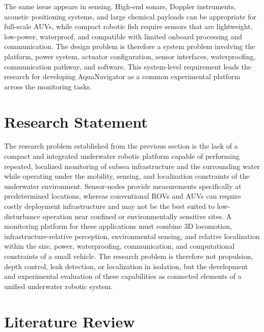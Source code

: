 \documentclass{uhcoethesis}
\begin{document}
The same issue appears in sensing. High-end sonars, Doppler instruments, acoustic positioning systems, and large chemical payloads can be appropriate for full-scale AUVs, while compact robotic fish require sensors that are lightweight, low-power, waterproof, and compatible with limited onboard processing and communication. The design problem is therefore a system problem involving the platform, power system, actuator configuration, sensor interfaces, waterproofing, communication pathway, and software. This system-level requirement leads the research for developing AquaNavigator as a common experimental platform across the monitoring tasks.

\section{Research Statement}

The research problem established from the previous section is the lack of a compact and integrated underwater robotic platform capable of performing repeated, localized monitoring of subsea infrastructure and the surrounding water while operating under the mobility, sensing, and localization constraints of the underwater environment. Sensor-nodes provide measurements specifically at predetermined locations, whereas conventional ROVs and AUVs can require costly deployment infrastructure and may not be the best suited to low-disturbance operation near confined or environmentally sensitive sites. A monitoring platform for these applications must combine 3D locomotion, infrastructure-relative perception, environmental sensing, and relative localization within the size, power, waterproofing, communication, and computational constraints of a small vehicle. The research problem is therefore not propulsion, depth control, leak detection, or localization in isolation, but the development and experimental evaluation of these capabilities as connected elements of a unified underwater robotic system.

\section{Literature Review}
\end{document}
